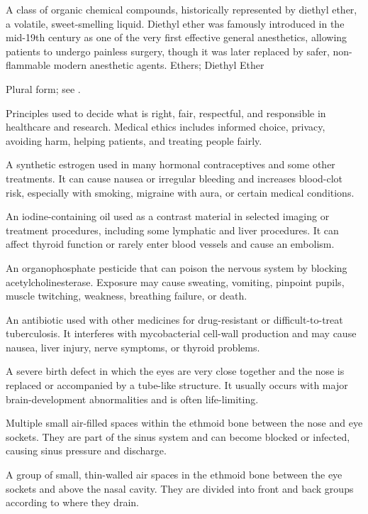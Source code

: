 A class of organic chemical compounds, historically represented by diethyl ether, a volatile, sweet-smelling liquid. Diethyl ether was famously introduced in the mid-19th century as one of the very first effective general anesthetics, allowing patients to undergo painless surgery, though it was later replaced by safer, non-flammable modern anesthetic agents.
\synonyms
Ethers; Diethyl Ether

 Plural form; see .

 Principles used to decide what is right, fair, respectful, and responsible in healthcare and research. Medical ethics includes informed choice, privacy, avoiding harm, helping patients, and treating people fairly.

 A synthetic estrogen used in many hormonal contraceptives and some other treatments. It can cause nausea or irregular bleeding and increases blood-clot risk, especially with smoking, migraine with aura, or certain medical conditions.

 An iodine-containing oil used as a contrast material in selected imaging or treatment procedures, including some lymphatic and liver procedures. It can affect thyroid function or rarely enter blood vessels and cause an embolism.

 An organophosphate pesticide that can poison the nervous system by blocking acetylcholinesterase. Exposure may cause sweating, vomiting, pinpoint pupils, muscle twitching, weakness, breathing failure, or death.

 An antibiotic used with other medicines for drug-resistant or difficult-to-treat tuberculosis. It interferes with mycobacterial cell-wall production and may cause nausea, liver injury, nerve symptoms, or thyroid problems.

 A severe birth defect in which the eyes are very close together and the nose is replaced or accompanied by a tube-like structure. It usually occurs with major brain-development abnormalities and is often life-limiting.

 Multiple small air-filled spaces within the ethmoid bone between the nose and eye sockets. They are part of the sinus system and can become blocked or infected, causing sinus pressure and discharge.

 A group of small, thin-walled air spaces in the ethmoid bone between the eye sockets and above the nasal cavity. They are divided into front and back groups according to where they drain.

